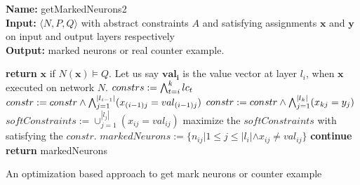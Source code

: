 \begin{algorithm}[t]
  \textbf{Name: } getMarkedNeurons2 \\
  \textbf{Input: } $\langle N,P,Q \rangle$ with abstract constraints $A$ and satisfying assignments $\boldsymbol{x}$ and $\boldsymbol{y}$ on input and output layers respectively\\
  \textbf{Output: } marked neurons or real counter example. 
  \begin{algorithmic}[1]
    \State \textbf{return} $\boldsymbol{x}$ if $N(\boldsymbol{x}) \models Q$. 
    \State Let us say $\boldsymbol{val_{i}}$ is the value vector at layer $l_i$, when $\boldsymbol{x}$ executed on network $N$. 
     
        \State $constrs := \bigwedge_{t=i}^k lc_t$
        \State $constr := constr \land \bigwedge_{j=1}^{|l_{i-1}|} (x_{(i-1)j} = val_{(i-1)j})$
        \State $constr := constr \land \bigwedge_{j=1}^{|l_k|} (x_{kj} = y_{j})$
        \State $softConstraints := \cup_{j=1}^{|l_j|} (x_{ij} = val_{ij})$
        \State maximize the $softConstraints$ with satisfying the $constr$. 
        \State $markedNeurons := \{n_{ij} | 1 \leq j \leq |l_i| \land x_{ij} \neq val_{ij}\}$ 
          \State \textbf{continue}
        \Else
          \State \textbf{return} markedNeurons
        \EndIf 
      \EndIf
    \EndFor
  \end{algorithmic}
  \caption{An optimization based approach to get mark neurons or counter example}
  \label{algo:refine2}
\end{algorithm}







